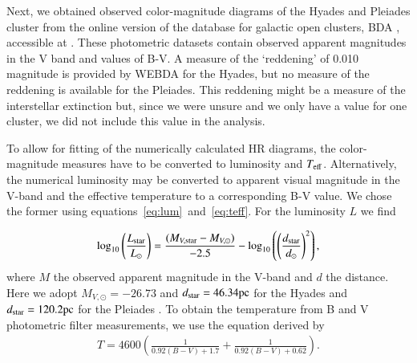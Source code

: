 \documentclass{aa}
\newcommand{\Sun}[0]{\ensuremath{_{\odot}}}
\begin{document}
    Next, we obtained observed color-magnitude diagrams of the Hyades and Pleiades cluster from the online version of the database for galactic open clusters, BDA \citep{1995ASSL..203..127M}, accessible at \citep{webda}. These photometric datasets contain observed apparent magnitudes in the V band and values of B-V. A measure of the `reddening' of 0.010 magnitude is provided by WEBDA for the Hyades, but no measure of the reddening is available for the Pleiades. This reddening might be a measure of the interstellar extinction but, since we were unsure and we only have a value for one cluster, we did not include this value in the analysis. 

    To allow for fitting of the numerically calculated HR diagrams, the color-magnitude measures have to be converted to luminosity and $T_{\rm eff}$. Alternatively, the numerical luminosity may be converted to apparent visual magnitude in the V-band and the effective temperature to a corresponding B-V value. We chose the former using equations~\eqref{eq:lum}~and~\eqref{eq:teff}. For the luminosity $L$ we find


\begin{eqnarray}
    \log_{10} \left(\frac{L_{\rm star}}{L\Sun}\right) = \frac{(M_{V,\rm star}-M_{V,\odot})}{-2.5} - \log_{10} \left( \left(\frac{d_{\rm star}}{d\Sun}\right)^2\right) \label{eq:lum},
\end{eqnarray}
where $M$ the observed apparent magnitude in the V-band and $d$ the distance. Here we adopt $M_{V, \odot} = -26.73$ \citep{1957ApJ...126..266S} and $d_{\rm star} = 46.34 \text{pc}$ for the Hyades \citep{1998A&A...331...81P} and $d_{\rm star} = 120.2 \text{pc}$ for the Pleiades \citep{2009A&A...497..209V}. To obtain the temperature from B and V photometric filter measurements, we use the equation derived by \citet{2012EL.....9734008B}
\begin{eqnarray}
    T = 4600 \left(\frac{1}{0.92 (B-V) + 1.7} + \frac{1}{0.92(B-V) + 0.62} \right) \label{eq:teff}.
\end{eqnarray}
\end{document}
